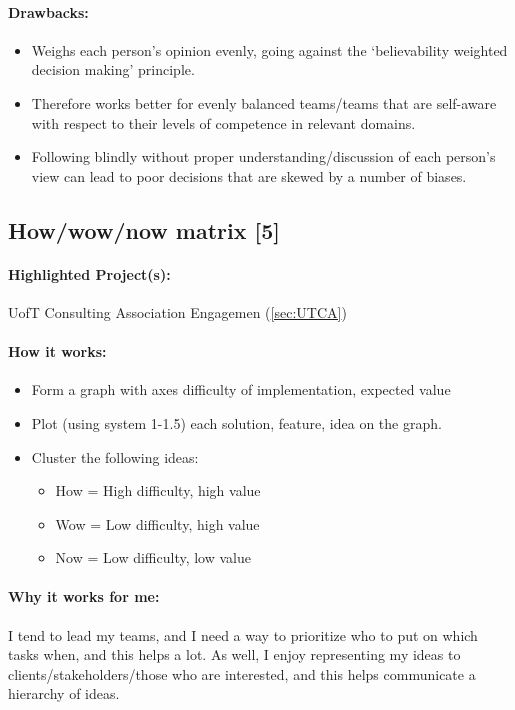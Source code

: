 \documentclass[a4paper,12pt]{article}
\begin{document}
\paragraph{Drawbacks: }
\begin{itemize}
	\item Weighs each person’s opinion evenly, going against the ‘believability weighted decision making’ principle.
	\item Therefore works better for evenly balanced teams/teams that are self-aware with respect to their levels of competence in relevant domains.
	\item Following blindly without proper understanding/discussion of each person’s view can lead to poor decisions that are skewed by a number of biases.
\end{itemize}

\subsection{How/wow/now matrix [5]}
\label{sec:how}
\paragraph{Highlighted Project(s): } UofT Consulting Association Engagemen (\ref{sec:UTCA})
\paragraph{How it works: } 
\begin{itemize}
\item Form a graph with axes {difficulty of implementation, expected value}
\item Plot (using system 1-1.5) each solution, feature, idea on the graph.
\item Cluster the following ideas:
\begin{itemize}
\item How = High difficulty, high value
\item Wow = Low difficulty, high value
\item Now = Low difficulty, low value
\end{itemize}
\end{itemize}

\paragraph{Why it works for me: }
I tend to lead my teams, and I need a way to prioritize who to put on which tasks when, and this helps a lot. As well, I enjoy representing my ideas to clients/stakeholders/those who are interested, and this helps communicate a hierarchy of ideas.
\end{document}
